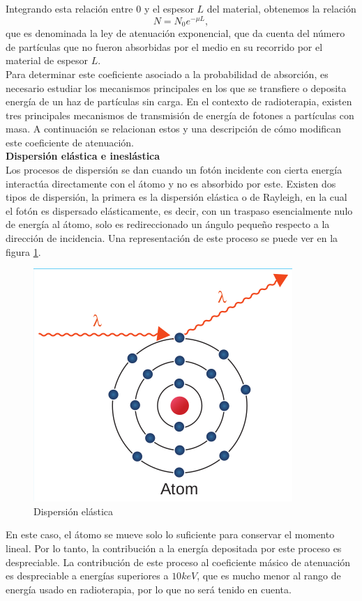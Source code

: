 Integrando esta relación entre $0$ y el espesor $L$ del material, obtenemos la relación
\begin{equation}
	N=N_0 e^{-\mu L},
\end{equation}
que es denominada la ley de atenuación exponencial, que da cuenta del número de partículas que no fueron absorbidas por el medio en su recorrido por el material de espesor $L$.\\

Para determinar este coeficiente asociado a la probabilidad de absorción, es necesario estudiar los mecanismos principales en los que se transfiere o deposita energía de un haz de partículas sin carga. En el contexto de radioterapia, existen tres principales mecanismos de transmisión de energía  de fotones a partículas con masa. A continuación se relacionan estos y una descripción de cómo modifican este coeficiente de atenuación.\\

\noindent
\textbf{Dispersión elástica e ineslástica}\\

Los procesos de dispersión se dan cuando un fotón incidente con cierta energía interactúa directamente con el átomo y no es absorbido por este. Existen dos tipos de dispersión, la primera es la dispersión elástica o de Rayleigh, en la cual el fotón es dispersado elásticamente, es decir, con un traspaso esencialmente nulo de energía al átomo, solo es redireccionado un ángulo pequeño respecto a la dirección de incidencia. Una representación de este proceso se puede ver en la figura \ref{fig:rayleigh}.\\
\begin{figure}[H]
	\centering
	\includegraphics[width=0.7\linewidth]{images/rayleigh.png}
	\caption{Dispersión elástica\cite{khan2014the}}
	\label{fig:rayleigh}
\end{figure}
En este caso, el átomo se mueve solo lo suficiente para conservar el momento lineal. Por lo tanto, la contribución a la energía depositada por este proceso es despreciable. La contribución de este proceso al coeficiente másico de atenuación es despreciable a energías superiores a $10 keV$, que es mucho menor al rango de energía usado en radioterapia, por lo que no será tenido en cuenta.  \\

